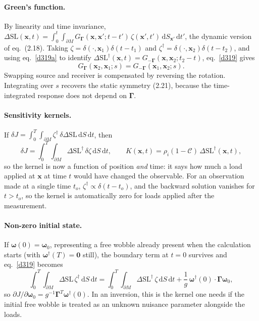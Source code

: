 \documentclass[11pt,a4paper]{article}
\newcommand{\bw}{\bm{\omega}}
\newcommand{\bx}{\mathbf{x}}
\newcommand{\bG}{\bm{\Gamma}}
\newcommand{\dSL}{\Delta\mathrm{SL}}
\newcommand{\oc}{\mathcal{C}}
\newcommand{\dd}{\,\mathrm{d}}
\newcommand{\pM}{\partial M}
\begin{document}
\paragraph{Green's function.} By linearity and time invariance,
$\dSL(\bx,t)=\int_0^t\!\int_{\pM}G_{\bG}(\bx,\bx';t-t')\,\zeta(\bx',t')\dd S_{\bx'}\dd t'$, the
dynamic version of eq.~(2.18). Taking $\zeta=\delta(\cdot,\bx_1)\delta(t-t_1)$ and
$\zeta^\dagger=\delta(\cdot,\bx_2)\delta(t-t_2)$, and using eq.~\eqref{d319a} to identify
$\dSL^\dagger(\bx,t)=G_{-\bG}(\bx,\bx_2;t_2-t)$, eq.~\eqref{d319} gives
\begin{equation}
  G_{\bG}(\bx_2,\bx_1;s)=G_{-\bG}(\bx_1,\bx_2;s).
  \tag{D2.21}\label{d221}
\end{equation}
Swapping source and receiver is compensated by reversing the rotation. Integrating over $s$
recovers the static symmetry (2.21), because the time-integrated response does not depend on
$\bG$.

\paragraph{Sensitivity kernels.} If $\delta J=\int_0^T\!\int_{\pM}\zeta^\dagger\,\delta\dSL\dd S\dd t$, then
\begin{equation}
  \delta J=\int_0^T\!\!\int_{\pM}\dSL^\dagger\,\delta\zeta\dd S\dd t,\qquad
  K(\bx,t)=\rho_i(1-\oc)\,\dSL^\dagger(\bx,t),
  \tag{D2.26}\label{d226}
\end{equation}
so the kernel is now a function of position \emph{and} time: it says how much a load applied at
$\bx$ at time $t$ would have changed the observable. For an observation made at a single time
$t_o$, $\zeta^\dagger\propto\delta(t-t_o)$, and the backward solution vanishes for $t>t_o$, so the
kernel is automatically zero for loads applied after the measurement.

\paragraph{Non-zero initial state.} If $\bw(0)=\bw_0$, representing a free wobble already present
when the calculation starts (with $\bw^\dagger(T)=\mathbf{0}$ still), the boundary term at $t=0$
survives and eq.~\eqref{d319} becomes
\begin{equation}
  \int_0^T\!\!\int_{\pM}\dSL\,\zeta^\dagger\dd S\dd t=\int_0^T\!\!\int_{\pM}\dSL^\dagger\,\zeta\dd S\dd t+\frac1g\,\bw^\dagger(0)\cdot\bG\bw_0 ,
  \tag{D3.19b}\label{d319b}
\end{equation}
so $\partial J/\partial\bw_0=g^{-1}\bG^T\bw^\dagger(0)$. In an inversion, this is the kernel one
needs if the initial free wobble is treated as an unknown nuisance parameter alongside the loads.
\end{document}
